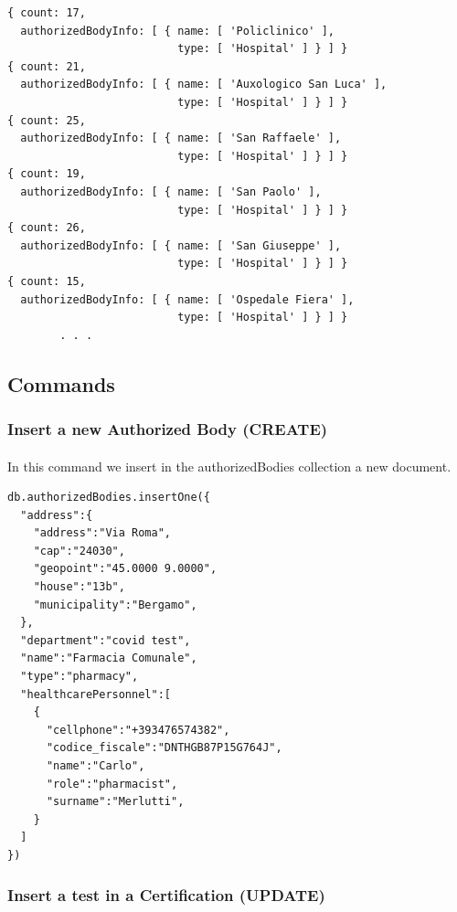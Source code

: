 \documentclass[a4paper,12pt]{article}
\begin{document}
\begin{tcolorbox}[colback=red!5!white,colframe=red!75!black,title=OUTPUT]
\begin{verbatim}
{ count: 17,
  authorizedBodyInfo: [ { name: [ 'Policlinico' ],
                          type: [ 'Hospital' ] } ] }
{ count: 21,
  authorizedBodyInfo: [ { name: [ 'Auxologico San Luca' ], 
                          type: [ 'Hospital' ] } ] }
{ count: 25,
  authorizedBodyInfo: [ { name: [ 'San Raffaele' ],
                          type: [ 'Hospital' ] } ] }
{ count: 19,
  authorizedBodyInfo: [ { name: [ 'San Paolo' ], 
                          type: [ 'Hospital' ] } ] }
{ count: 26,
  authorizedBodyInfo: [ { name: [ 'San Giuseppe' ], 
                          type: [ 'Hospital' ] } ] }
{ count: 15,
  authorizedBodyInfo: [ { name: [ 'Ospedale Fiera' ], 
                          type: [ 'Hospital' ] } ] }
        . . .
\end{verbatim}
\end{tcolorbox}


\subsection{Commands}
\subsubsection{Insert a new Authorized Body (CREATE)}
\paragraph{} In this command we insert in the authorizedBodies collection a new document.

\begin{tcolorbox}[colback=orange!5!white,colframe=orange!75!black,title=COMMAND]
\begin{verbatim}
db.authorizedBodies.insertOne({
  "address":{
    "address":"Via Roma",
    "cap":"24030",
    "geopoint":"45.0000 9.0000",
    "house":"13b",
    "municipality":"Bergamo",
  },
  "department":"covid test",
  "name":"Farmacia Comunale",
  "type":"pharmacy",
  "healthcarePersonnel":[
    {
      "cellphone":"+393476574382",
      "codice_fiscale":"DNTHGB87P15G764J",
      "name":"Carlo",
      "role":"pharmacist",
      "surname":"Merlutti",
    }
  ]
})
\end{verbatim}
\end{tcolorbox}

\subsubsection{Insert a test in a Certification (UPDATE) }
\end{document}
